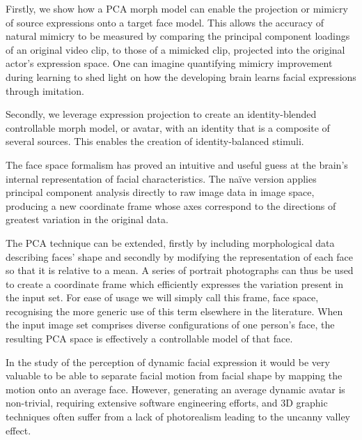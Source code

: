 \documentclass[runningheads]{llncs}
\begin{document}
Firstly, we show how a PCA morph model can enable the projection or mimicry of source expressions onto a target face model. This allows the accuracy of natural mimicry to be measured by comparing the principal component loadings of an original video clip, to those of a mimicked clip, projected into the original actor's expression space.  One can imagine quantifying mimicry improvement during learning to shed light on how the developing brain learns facial expressions through imitation\cite{grossberg2010children}. 

Secondly, we leverage expression projection to create an identity-blended controllable morph model, or avatar, with an identity that is a composite of several sources. This enables the creation of identity-balanced stimuli. 



The face space formalism\cite{valentine2001face} has proved an intuitive and useful guess at the brain's internal representation of facial characteristics. The na\"{i}ve version\cite{turk1991face} applies principal component analysis directly to raw image data in image space, producing a new coordinate frame whose axes correspond to the directions of greatest variation in the original data.

The PCA technique can be extended, firstly by including morphological data describing faces' shape and secondly by modifying the representation of each face so that it is relative to a mean. A series of portrait photographs can thus be used to create a coordinate frame which efficiently expresses the variation present in the input set. For ease of usage we will simply call this frame, face space, recognising the more generic use of this term elsewhere in the literature\cite{valentine2001face}.  When the input image set comprises diverse configurations of one person's face, the resulting PCA space is effectively a controllable model of that face.

In the study of the perception of dynamic facial expression it would be very valuable to be able to separate facial motion from facial shape by mapping the motion onto an average face. However, generating an average dynamic avatar is non-trivial, requiring extensive software engineering efforts\cite{itti2003realistic,rajan2002realistic}, and 3D graphic techniques often suffer from a lack of photorealism leading to the uncanny valley effect\cite{mori1970uncanny}.
\end{document}
